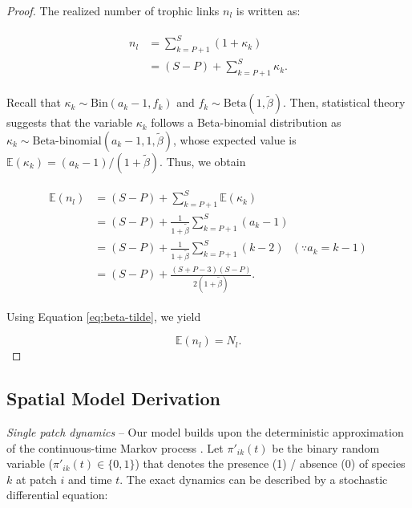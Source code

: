 \documentclass[11pt, class=article, crop=false]{standalone}
\theoremstyle{definition}
\begin{document}
\begin{proof}
    The realized number of trophic links $n_l$ is written as:

    \begin{align}
        \begin{split}
            n_l &= \sum_{k = P + 1}^{S}(1 + \kappa_k)\\ 
                &= (S - P) + \sum_{k = P + 1}^{S} \kappa_k.
        \end{split}
    \end{align}

    Recall that $\kappa_k \sim \mbox{Bin}(a_k - 1, f_k)$ and $f_k \sim \mbox{Beta}(1, \tilde{\beta})$.
    Then, statistical theory suggests that the variable $\kappa_k$ follows a Beta-binomial distribution as $\kappa_k \sim \mbox{Beta-binomial}(a_k - 1, 1, \tilde{\beta})$, whose expected value is $\mathbb{E}(\kappa_k) = (a_k - 1) / (1 + \tilde{\beta})$.
    Thus, we obtain

    \begin{align}
    \begin{split}
        \mathbb{E}(n_l) 
        &= (S - P) + \sum_{k = P + 1}^{S} \mathbb{E}(\kappa_k)\\
        &= (S - P) + \frac{1}{1 + \tilde{\beta}} \sum_{k = P + 1}^{S} (a_k - 1)\\
        &= (S - P) + \frac{1}{1 + \tilde{\beta}} \sum_{k = P + 1}^{S} (k - 2)~~~(\because a_k = k - 1)\\
        &= (S - P) + \frac{(S + P - 3)(S - P)}{2 (1 + \tilde{\beta})}.
    \end{split}
    \end{align}

    Using Equation \ref{eq:beta-tilde}, we yield

    \begin{equation}
        \mathbb{E}(n_l)  = N_l.
    \end{equation}
    
\end{proof}

\newpage

\subsection{Spatial Model Derivation}

\textit{Single patch dynamics} --
Our model builds upon the deterministic approximation of the continuous-time Markov process \citep{ovaskainen_asymptotically_2006}.
Let $\pi'_{ik}(t)$ be the binary random variable ($\pi'_{ik}(t) \in \{0, 1\}$) that denotes the presence (1) / absence (0) of species $k$ at patch $i$ and time $t$.
The exact dynamics can be described by a stochastic differential equation:
\end{document}
